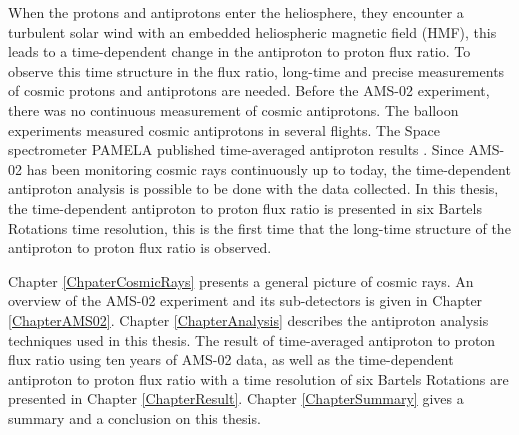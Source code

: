 When the protons and antiprotons enter the heliosphere, they encounter a turbulent solar wind with an embedded heliospheric magnetic field (HMF), this leads to a time-dependent change in the antiproton to proton flux ratio. To observe this time structure in the flux ratio, long-time and precise measurements of cosmic protons and antiprotons are needed. Before the AMS-02 experiment, there was no continuous measurement of cosmic antiprotons. The balloon experiments measured cosmic antiprotons in several flights. The Space spectrometer PAMELA published time-averaged antiproton results \cite{PamelaAntiproton350Paper}. Since AMS-02 has been monitoring cosmic rays continuously up to today, the time-dependent antiproton analysis is possible to be done with the data collected. In this thesis, the time-dependent antiproton to proton flux ratio is presented in six Bartels Rotations time resolution, this is the first time that the long-time structure of the antiproton to proton flux ratio is observed. \par

Chapter \ref{ChpaterCosmicRays} presents a general picture of cosmic rays. An overview of the AMS-02 experiment and its sub-detectors is given in Chapter \ref{ChapterAMS02}. Chapter \ref{ChapterAnalysis} describes the antiproton analysis techniques used in this thesis. The result of time-averaged antiproton to proton flux ratio using ten years of AMS-02 data, as well as the time-dependent antiproton to proton flux ratio with a time resolution of six Bartels Rotations are presented in Chapter \ref{ChapterResult}. Chapter \ref{ChapterSummary} gives a summary and a conclusion on this thesis.  


